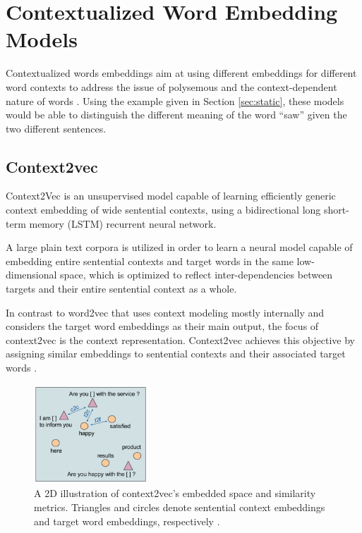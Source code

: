         

    
    \section{Contextualized Word Embedding Models}
    \label{sec:context}    
        \par Contextualized words embeddings aim at using different embeddings for different word contexts to address the issue of polysemous and the context-dependent nature of words \cite{Batista2018}. Using the example given in  Section \ref{sec:static}, these models would be able to distinguish the different meaning of the word \enquote{saw} given the two different sentences.

        \subsection{Context2vec}
        
            \par Context2Vec is an unsupervised model capable of learning efficiently generic context embedding of wide sentential contexts, using a bidirectional 
            long short-term memory (LSTM) recurrent neural network. 

            A large plain text corpora is utilized in order to learn a neural model capable of embedding  entire  sentential  contexts  and  target words in the same low-dimensional space, which is optimized to reflect inter-dependencies between targets and their entire sentential context as a whole. 
            
            
            In contrast to word2vec that uses context modeling mostly internally and considers the target word embeddings as their main output, the focus of context2vec is the context representation. Context2vec achieves this objective by assigning similar embeddings to sentential contexts and their associated target words \cite{Melamud2016}.

            \begin{figure}[H]
                \centering
                \captionsetup{justification=centering}
                \includegraphics[width=0.38\textwidth]{Sections/3StateOfTheArt/3_images/context2vec_embedding.png}
                \caption[Context2vec’s embedded space and similarity metrics.]{A 2D illustration of context2vec’s embedded space and similarity metrics. Triangles and circles denote sentential context embeddings and target word embeddings, respectively \cite{Melamud2016}.} 
            \end{figure}

